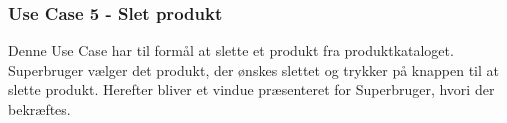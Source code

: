 \subsubsection{Use Case 5 - Slet produkt}
Denne Use Case har til formål at slette et produkt fra produktkataloget. Superbruger vælger det produkt, der ønskes slettet og trykker på knappen til at slette produkt. Herefter bliver et vindue præsenteret for Superbruger, hvori der bekræftes.